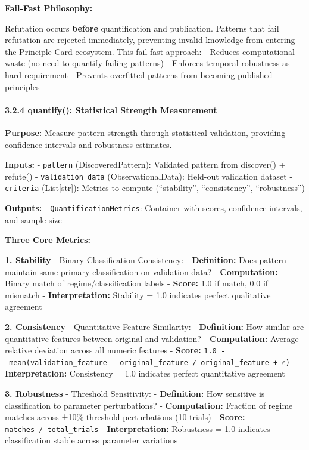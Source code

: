 \documentclass[
]{article}
\begin{document}
\textbf{Fail-Fast Philosophy:}

Refutation occurs \textbf{before} quantification and publication.
Patterns that fail refutation are rejected immediately, preventing
invalid knowledge from entering the Principle Card ecosystem. This
fail-fast approach: - Reduces computational waste (no need to quantify
failing patterns) - Enforces temporal robustness as hard requirement -
Prevents overfitted patterns from becoming published principles

\paragraph{3.2.4 quantify(): Statistical Strength
Measurement}\label{quantify-statistical-strength-measurement}

\textbf{Purpose:} Measure pattern strength through statistical
validation, providing confidence intervals and robustness estimates.

\textbf{Inputs:} - \texttt{pattern} (DiscoveredPattern): Validated
pattern from discover() + refute() - \texttt{validation\_data}
(ObservationalData): Held-out validation dataset - \texttt{criteria}
(List{[}str{]}): Metrics to compute (``stability'', ``consistency'',
``robustness'')

\textbf{Outputs:} - \texttt{QuantificationMetrics}: Container with
scores, confidence intervals, and sample size

\textbf{Three Core Metrics:}

\textbf{1. Stability} - Binary Classification Consistency: -
\textbf{Definition:} Does pattern maintain same primary classification
on validation data? - \textbf{Computation:} Binary match of
regime/classification labels - \textbf{Score:} 1.0 if match, 0.0 if
mismatch - \textbf{Interpretation:} Stability = 1.0 indicates perfect
qualitative agreement

\textbf{2. Consistency} - Quantitative Feature Similarity: -
\textbf{Definition:} How similar are quantitative features between
original and validation? - \textbf{Computation:} Average relative
deviation across all numeric features - \textbf{Score:}
\texttt{1.0\ -\ mean(\textbar{}validation\_feature\ -\ original\_feature\textbar{}\ /\ \textbar{}original\_feature\ +\ $\varepsilon$\textbar{})}
- \textbf{Interpretation:} Consistency = 1.0 indicates perfect
quantitative agreement

\textbf{3. Robustness} - Threshold Sensitivity: - \textbf{Definition:}
How sensitive is classification to parameter perturbations? -
\textbf{Computation:} Fraction of regime matches across ±10\% threshold
perturbations (10 trials) - \textbf{Score:}
\texttt{matches\ /\ total\_trials} - \textbf{Interpretation:} Robustness
= 1.0 indicates classification stable across parameter variations
\end{document}
